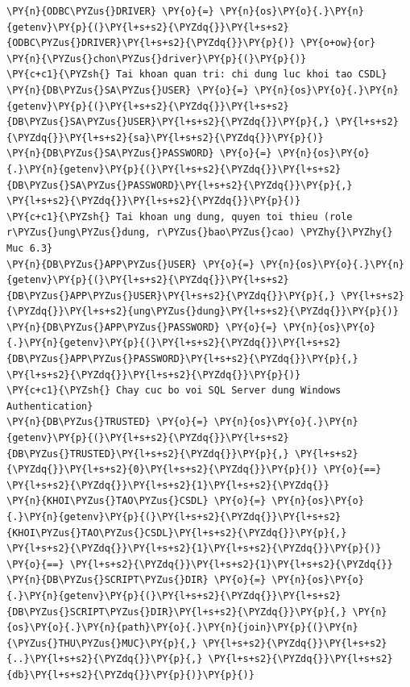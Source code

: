 \begin{Verbatim}[commandchars=\\\{\},frame=single,framerule=0.3pt,rulecolor=\color{black!40},fontsize=\footnotesize,breaklines=true]
\PY{n}{ODBC\PYZus{}DRIVER} \PY{o}{=} \PY{n}{os}\PY{o}{.}\PY{n}{getenv}\PY{p}{(}\PY{l+s+s2}{\PYZdq{}}\PY{l+s+s2}{ODBC\PYZus{}DRIVER}\PY{l+s+s2}{\PYZdq{}}\PY{p}{)} \PY{o+ow}{or} \PY{n}{\PYZus{}chon\PYZus{}driver}\PY{p}{(}\PY{p}{)}
\PY{c+c1}{\PYZsh{} Tai khoan quan tri: chi dung luc khoi tao CSDL}
\PY{n}{DB\PYZus{}SA\PYZus{}USER} \PY{o}{=} \PY{n}{os}\PY{o}{.}\PY{n}{getenv}\PY{p}{(}\PY{l+s+s2}{\PYZdq{}}\PY{l+s+s2}{DB\PYZus{}SA\PYZus{}USER}\PY{l+s+s2}{\PYZdq{}}\PY{p}{,} \PY{l+s+s2}{\PYZdq{}}\PY{l+s+s2}{sa}\PY{l+s+s2}{\PYZdq{}}\PY{p}{)}
\PY{n}{DB\PYZus{}SA\PYZus{}PASSWORD} \PY{o}{=} \PY{n}{os}\PY{o}{.}\PY{n}{getenv}\PY{p}{(}\PY{l+s+s2}{\PYZdq{}}\PY{l+s+s2}{DB\PYZus{}SA\PYZus{}PASSWORD}\PY{l+s+s2}{\PYZdq{}}\PY{p}{,} \PY{l+s+s2}{\PYZdq{}}\PY{l+s+s2}{\PYZdq{}}\PY{p}{)}
\PY{c+c1}{\PYZsh{} Tai khoan ung dung, quyen toi thieu (role r\PYZus{}ung\PYZus{}dung, r\PYZus{}bao\PYZus{}cao) \PYZhy{}\PYZhy{} Muc 6.3}
\PY{n}{DB\PYZus{}APP\PYZus{}USER} \PY{o}{=} \PY{n}{os}\PY{o}{.}\PY{n}{getenv}\PY{p}{(}\PY{l+s+s2}{\PYZdq{}}\PY{l+s+s2}{DB\PYZus{}APP\PYZus{}USER}\PY{l+s+s2}{\PYZdq{}}\PY{p}{,} \PY{l+s+s2}{\PYZdq{}}\PY{l+s+s2}{ung\PYZus{}dung}\PY{l+s+s2}{\PYZdq{}}\PY{p}{)}
\PY{n}{DB\PYZus{}APP\PYZus{}PASSWORD} \PY{o}{=} \PY{n}{os}\PY{o}{.}\PY{n}{getenv}\PY{p}{(}\PY{l+s+s2}{\PYZdq{}}\PY{l+s+s2}{DB\PYZus{}APP\PYZus{}PASSWORD}\PY{l+s+s2}{\PYZdq{}}\PY{p}{,} \PY{l+s+s2}{\PYZdq{}}\PY{l+s+s2}{\PYZdq{}}\PY{p}{)}
\PY{c+c1}{\PYZsh{} Chay cuc bo voi SQL Server dung Windows Authentication}
\PY{n}{DB\PYZus{}TRUSTED} \PY{o}{=} \PY{n}{os}\PY{o}{.}\PY{n}{getenv}\PY{p}{(}\PY{l+s+s2}{\PYZdq{}}\PY{l+s+s2}{DB\PYZus{}TRUSTED}\PY{l+s+s2}{\PYZdq{}}\PY{p}{,} \PY{l+s+s2}{\PYZdq{}}\PY{l+s+s2}{0}\PY{l+s+s2}{\PYZdq{}}\PY{p}{)} \PY{o}{==} \PY{l+s+s2}{\PYZdq{}}\PY{l+s+s2}{1}\PY{l+s+s2}{\PYZdq{}}
\PY{n}{KHOI\PYZus{}TAO\PYZus{}CSDL} \PY{o}{=} \PY{n}{os}\PY{o}{.}\PY{n}{getenv}\PY{p}{(}\PY{l+s+s2}{\PYZdq{}}\PY{l+s+s2}{KHOI\PYZus{}TAO\PYZus{}CSDL}\PY{l+s+s2}{\PYZdq{}}\PY{p}{,} \PY{l+s+s2}{\PYZdq{}}\PY{l+s+s2}{1}\PY{l+s+s2}{\PYZdq{}}\PY{p}{)} \PY{o}{==} \PY{l+s+s2}{\PYZdq{}}\PY{l+s+s2}{1}\PY{l+s+s2}{\PYZdq{}}
\PY{n}{DB\PYZus{}SCRIPT\PYZus{}DIR} \PY{o}{=} \PY{n}{os}\PY{o}{.}\PY{n}{getenv}\PY{p}{(}\PY{l+s+s2}{\PYZdq{}}\PY{l+s+s2}{DB\PYZus{}SCRIPT\PYZus{}DIR}\PY{l+s+s2}{\PYZdq{}}\PY{p}{,} \PY{n}{os}\PY{o}{.}\PY{n}{path}\PY{o}{.}\PY{n}{join}\PY{p}{(}\PY{n}{\PYZus{}THU\PYZus{}MUC}\PY{p}{,} \PY{l+s+s2}{\PYZdq{}}\PY{l+s+s2}{..}\PY{l+s+s2}{\PYZdq{}}\PY{p}{,} \PY{l+s+s2}{\PYZdq{}}\PY{l+s+s2}{db}\PY{l+s+s2}{\PYZdq{}}\PY{p}{)}\PY{p}{)}


\end{Verbatim}
